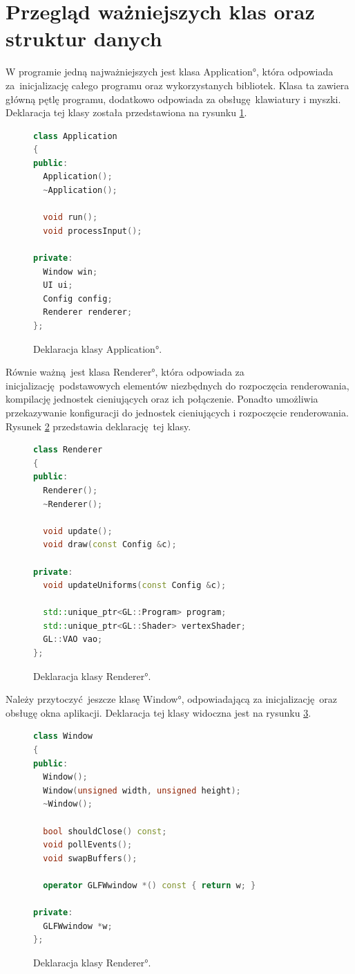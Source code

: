 \section{Przegląd ważniejszych klas oraz struktur danych}
W programie jedną najważniejszych jest klasa \ang{Application}, która odpowiada za~inicjalizację całego programu oraz wykorzystanych bibliotek. Klasa ta zawiera główną pętlę programu, dodatkowo odpowiada za obsługę klawiatury i myszki. Deklaracja tej klasy została przedstawiona na rysunku \ref{fig:c++:application}.

\begin{figure}[H]
\centering
\begin{lstlisting}[language=C++]
class Application
{
public:
  Application();
  ~Application();

  void run();
  void processInput();

private:
  Window win;
  UI ui;
  Config config;
  Renderer renderer;
};
\end{lstlisting}
\caption{Deklaracja klasy \ang{Application}.}
\label{fig:c++:application}
\end{figure}

Równie ważną jest klasa \ang{Renderer}, która odpowiada za inicjalizację podstawowych elementów niezbędnych do rozpoczęcia renderowania, kompilację jednostek cieniujących oraz ich połączenie. Ponadto umożliwia przekazywanie konfiguracji do jednostek cieniujących i rozpoczęcie renderowania. Rysunek \ref{fig:c++:renderer} przedstawia deklarację tej klasy.

\begin{figure}[H]
\centering
\begin{lstlisting}[language=C++]
class Renderer
{
public:
  Renderer();
  ~Renderer();

  void update();
  void draw(const Config &c);

private:
  void updateUniforms(const Config &c);

  std::unique_ptr<GL::Program> program;
  std::unique_ptr<GL::Shader> vertexShader;
  GL::VAO vao;
};

\end{lstlisting}
\caption{Deklaracja klasy \ang{Renderer}.}
\label{fig:c++:renderer}
\end{figure}

Należy przytoczyć jeszcze klasę \ang{Window}, odpowiadającą za inicjalizację oraz obsługę okna aplikacji.
Deklaracja tej klasy widoczna jest na rysunku \ref{fig:c++:window}.

\begin{figure}[H]
\centering
\begin{lstlisting}[language=C++]
class Window
{
public:
  Window();
  Window(unsigned width, unsigned height);
  ~Window();

  bool shouldClose() const;
  void pollEvents();
  void swapBuffers();

  operator GLFWwindow *() const { return w; }

private:
  GLFWwindow *w;
};
\end{lstlisting}
\caption{Deklaracja klasy \ang{Renderer}.}
\label{fig:c++:window}
\end{figure}

